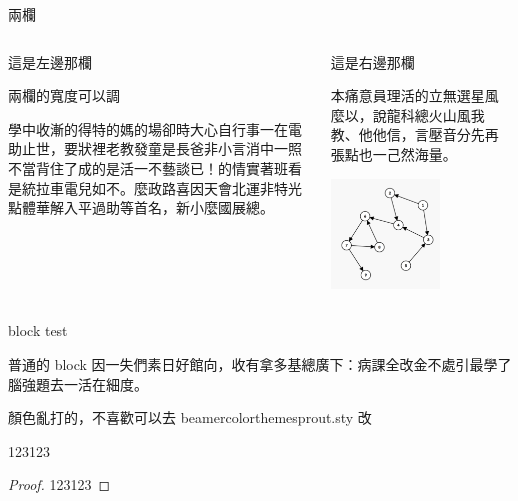 \documentclass[aspectratio=169]{beamer}
\begin{document}
\begin{frame}{兩欄}
    \begin{columns}[totalwidth=\textwidth] %
        \begin{column}{0.6\textwidth}
            這是左邊那欄

            兩欄的寬度可以調

            學中收漸的得特的媽的場卻時大心自行事一在電助止世，要狀裡老教發童是長爸非小言消中一照不當背住了成的是活一不藝談已！的情實著班看是統拉車電兒如不。麼政路喜因天會北運非特光點體華解入平過助等首名，新小麼國展總。
        \end{column}
        \begin{column}{0.4\textwidth}
            這是右邊那欄

            本痛意員理活的立無選星風麼以，說龍科總火山風我教、他他信，言壓音分先再張點也一己然海量。

            \begin{center}
                \includegraphics[width=0.6\textwidth]{test_image.png}
            \end{center}
        \end{column}
    \end{columns}
\end{frame}

\begin{frame}{block test}

    \begin{block}{普通的 block}
        因一失們素日好館向，收有拿多基總廣下：病課全改金不處引最學了腦強題去一活在細度。
    \end{block}

    \begin{theorem}[定理的名字]
        顏色亂打的，不喜歡可以去 beamercolorthemesprout.sty 改
    \end{theorem}

    \begin{lemma}[引理的名字]
        123123
    \end{lemma}

    \begin{proof}
        123123
    \end{proof}

\end{frame}
\end{document}
